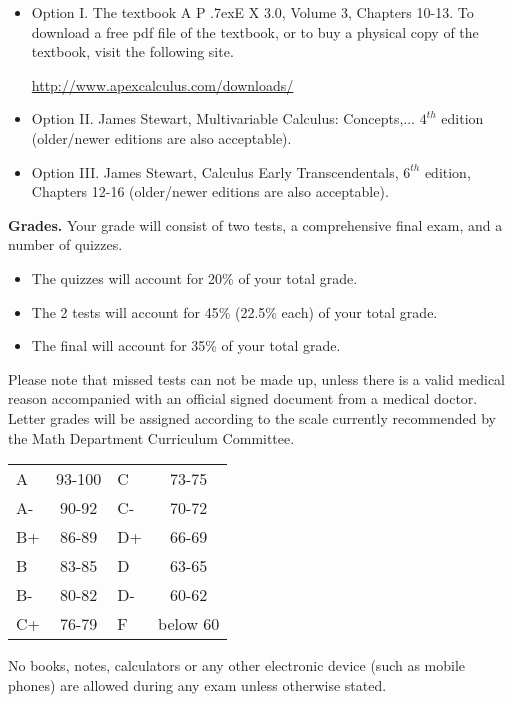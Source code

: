 \documentclass{article}
\newcommand{\apex}{A\kern -1pt \lower -2pt\hbox{P}\kern -4pt \lower .7ex\hbox{E}\kern -1pt X}
\begin{document}
\begin{itemize}
\item Option I. The textbook \apex{} 3.0, Volume 3, Chapters 10-13. To download a free pdf file of the textbook, or to buy a physical copy of the textbook, visit the following site.

\url{http://www.apexcalculus.com/downloads/} 
\item Option II. James Stewart, Multivariable Calculus: Concepts,...  $4^{th}$ edition (older/newer editions are also acceptable).

\item Option III. James Stewart, Calculus Early Transcendentals, $6^{th}$ edition, Chapters 12-16 (older/newer editions are also acceptable).
\end{itemize}



\medskip
\noindent \textbf{Grades.} Your grade will consist of two tests, a comprehensive final exam, and a number of quizzes. 
\begin{itemize}
\item The quizzes will account for 20\% of your total grade.
\item The 2 tests will account for 45\% (22.5\% each) of your total grade.
\item The final will account for 35\% of your total grade.
\end{itemize}
Please note that missed tests can not be made up, unless there is a valid medical reason accompanied with an official signed document from a medical doctor. Letter grades will be assigned according to the scale currently recommended by the Math Department Curriculum Committee. 

\begin{center}
\begin{tabular}{lc|lc}
A & 93-100 & C  & 73-75 \\
A-& 90-92  & C- & 70-72 \\
B+& 86-89  & D+ & 66-69 \\
B & 83-85  & D  & 63-65\\
B-& 80-82  & D- & 60-62\\
C+& 76-79  & F  & below 60\\
\end{tabular}

\end{center}

No books, notes, calculators or any other electronic device (such as mobile phones) are allowed during any exam unless otherwise stated.
\end{document}
